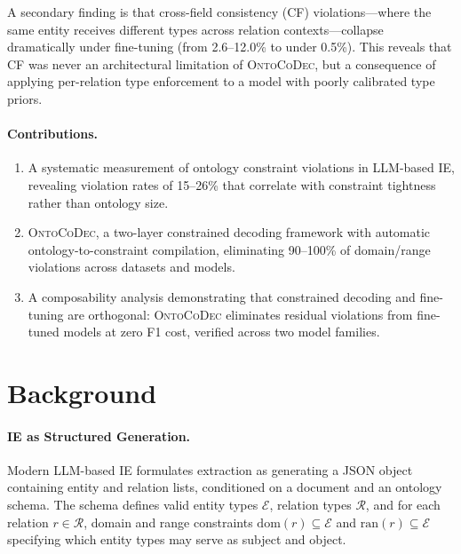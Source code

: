 \documentclass[11pt,a4paper]{article}
\newcommand{\sys}{\textsc{OntoCoDec}}
\begin{document}
A secondary finding is that cross-field consistency (CF) violations---where the same entity receives different types across relation contexts---collapse dramatically under fine-tuning (from 2.6--12.0\% to under 0.5\%). This reveals that CF was never an architectural limitation of \sys{}, but a consequence of applying per-relation type enforcement to a model with poorly calibrated type priors.

\paragraph{Contributions.}
\begin{enumerate}[nosep,leftmargin=*]
    \item A systematic measurement of ontology constraint violations in LLM-based IE, revealing violation rates of 15--26\% that correlate with constraint tightness rather than ontology size.
    \item \sys{}, a two-layer constrained decoding framework with automatic ontology-to-constraint compilation, eliminating 90--100\% of domain/range violations across datasets and models.
    \item A composability analysis demonstrating that constrained decoding and fine-tuning are orthogonal: \sys{} eliminates residual violations from fine-tuned models at zero F1 cost, verified across two model families.
\end{enumerate}

\section{Background}
\label{sec:background}

\paragraph{IE as Structured Generation.}
Modern LLM-based IE formulates extraction as generating a JSON object containing entity and relation lists, conditioned on a document and an ontology schema. The schema defines valid entity types $\mathcal{E}$, relation types $\mathcal{R}$, and for each relation $r \in \mathcal{R}$, domain and range constraints $\text{dom}(r) \subseteq \mathcal{E}$ and $\text{ran}(r) \subseteq \mathcal{E}$ specifying which entity types may serve as subject and object.
\end{document}
